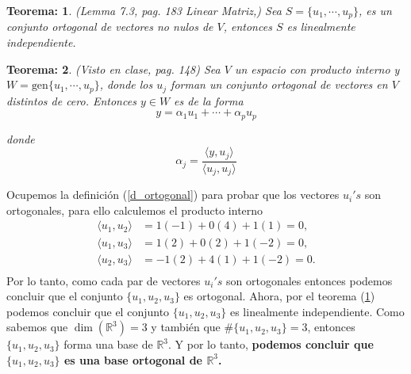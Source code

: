 \documentclass[11pt,letterpaper]{article}
\newcommand{\mR}{\mathbb{R}}
\newcommand{\gen}{\text{gen}}
\newtheorem{thmt}{Teorema:}
\begin{document}
\begin{itemize}
\begin{framed}
    \begin{thmt} \label{t_ortogonal}
	(Lemma 7.3, pag. 183 Linear Matriz,) Sea $S=\{u_1 ,\cdots, u_p \}$, es un conjunto ortogonal de vectores no nulos de $V$, entonces $S$ es linealmente independiente.
    \end{thmt}
\end{framed}

\begin{framed}
    \begin{thmt} \label{t_combinacion_lineal}
	(Visto en clase, pag. 148) Sea $V$ un espacio con producto interno y $W = \gen\{u_1 ,\cdots, u_p \}$, donde los $u_j$ forman un conjunto ortogonal de vectores en $V$ distintos de cero. Entonces $y\in W$ es de la forma
$$y=\alpha_1 u_1 + \cdots + \alpha_p u_p$$

donde
$$\alpha_j = \frac{\langle y, u_j \rangle}{\langle u_j, u_j \rangle}$$
    \end{thmt}
\end{framed}
Ocupemos la definición (\ref{d_ortogonal}) para probar que los vectores $u_i's$ son ortogonales, para ello calculemos el producto interno
\begin{align*}
\langle u_1, u_2 \rangle &= 1 (-1)+0(4)+1(1) = 0,\\
\langle u_1, u_3 \rangle &= 1(2) + 0(2)+1(-2)=0, \\
\langle u_2, u_3 \rangle &= -1(2)+4(1)+1(-2)=0.\\
\end{align*} 
Por lo tanto, como cada par de vectores $u_i's$ son ortogonales entonces podemos concluir que el conjunto $\{u_1, u_2,u_3\}$ es ortogonal. Ahora, por el teorema (\ref{t_ortogonal}) podemos concluir que el conjunto $\{u_1, u_2,u_3\}$ es linealmente independiente.  Como sabemos que $\dim(\mR^3)=3$ y también que $\#\{u_1, u_2,u_3\}=3$, entonces $\{u_1, u_2,u_3\}$ forma una base de $\mR^3$. Y por lo tanto, \textbf{podemos concluir que $\{u_1, u_2,u_3\}$ es una base ortogonal de $\mR^3$.}


\end{itemize}
\end{document}
